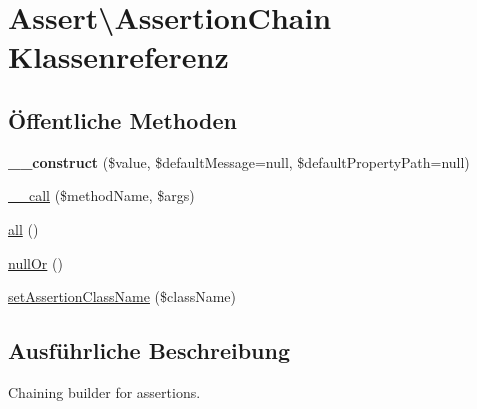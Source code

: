 \hypertarget{class_assert_1_1_assertion_chain}{}\section{Assert\textbackslash{}Assertion\+Chain Klassenreferenz}
\label{class_assert_1_1_assertion_chain}
\subsection*{Öffentliche Methoden}
\begin{DoxyCompactItemize}
\item 
\mbox{\label{class_assert_1_1_assertion_chain_a49fbb53af3c361b44b7f80c1302f02e4}} 
{\bfseries \+\_\+\+\_\+construct} (\$value, \$default\+Message=null, \$default\+Property\+Path=null)
\item 
\mbox{\hyperlink{class_assert_1_1_assertion_chain_a948e308ca827b8e2c7c58016582e37f1}{\+\_\+\+\_\+call}} (\$method\+Name, \$args)
\item 
\mbox{\hyperlink{class_assert_1_1_assertion_chain_ab6dda0b022dca688ca8a670c2a2d8c50}{all}} ()
\item 
\mbox{\hyperlink{class_assert_1_1_assertion_chain_a2878fa5f9807b8bcdd1d9f214cbd91a4}{null\+Or}} ()
\item 
\mbox{\hyperlink{class_assert_1_1_assertion_chain_a178d218f383d9a06310dab487f20b633}{set\+Assertion\+Class\+Name}} (\$class\+Name)
\end{DoxyCompactItemize}


\subsection{Ausführliche Beschreibung}
Chaining builder for assertions.

